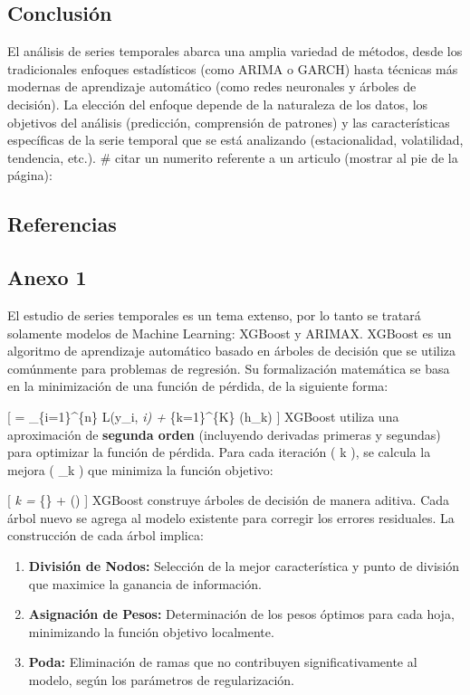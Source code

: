 \subsection{Conclusión}\label{conclusiuxf3n}

El análisis de series temporales abarca una amplia variedad de métodos,
desde los tradicionales enfoques estadísticos (como ARIMA o GARCH) hasta
técnicas más modernas de aprendizaje automático (como redes neuronales y
árboles de decisión). La elección del enfoque depende de la naturaleza
de los datos, los objetivos del análisis (predicción, comprensión de
patrones) y las características específicas de la serie temporal que se
está analizando (estacionalidad, volatilidad, tendencia, etc.).
# citar un numerito referente a un articulo (mostrar al pie de la página): 

\subsection{Referencias}\label{referencias}



\subsection{Anexo 1}\label{anexo-1}

El estudio de series temporales es un tema extenso, por lo tanto se
tratará solamente modelos de Machine Learning: XGBoost y ARIMAX. XGBoost
es un algoritmo de aprendizaje automático basado en árboles de decisión
que se utiliza comúnmente para problemas de regresión. Su formalización
matemática se basa en la minimización de una función de pérdida, de la
siguiente forma:

{[}  = \sum\_\{i=1\}\^{}\{n\} L(y\_i, \emph{i) +
\sum}\{k=1\}\^{}\{K\} \Omega(h\_k) {]} XGBoost utiliza una aproximación
de \textbf{segunda orden} (incluyendo derivadas primeras y segundas)
para optimizar la función de pérdida. Para cada iteración ( k ), se
calcula la mejora ( \gamma\_k ) que minimiza la función objetivo:

{[} \gamma\emph{k = \arg\min}\{\gamma\}
 +
\Omega(\gamma) {]} XGBoost construye árboles de decisión de manera
aditiva. Cada árbol nuevo se agrega al modelo existente para corregir
los errores residuales. La construcción de cada árbol implica:

\begin{enumerate}
\def\labelenumi{\arabic{enumi}.}
\tightlist
\item
  \textbf{División de Nodos:} Selección de la mejor característica y
  punto de división que maximice la ganancia de información.
\item
  \textbf{Asignación de Pesos:} Determinación de los pesos óptimos para
  cada hoja, minimizando la función objetivo localmente.
\item
  \textbf{Poda:} Eliminación de ramas que no contribuyen
  significativamente al modelo, según los parámetros de regularización.
\end{enumerate}

